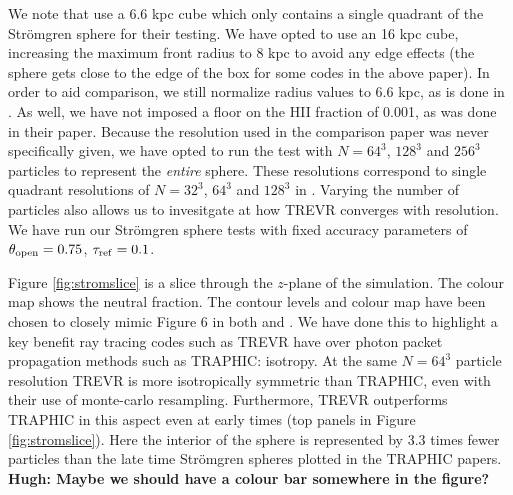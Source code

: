 \documentclass[fleq,usenatbib]{mnras}
\newcommand{\acro}{TREVR}
\newcommand{\comment}[1]{\textbf{\color{red}#1}}
\newcommand{\tO}{\theta_{\rm open}}
\newcommand{\strom}{Str\"omgren}
\begin{document}
{We note that \cite{ilievEt06} use a 6.6 kpc cube which only contains a single
quadrant of the \strom{} sphere for their testing. We have opted to use an 16 
kpc cube, increasing the maximum front radius to 8 kpc to avoid any edge 
effects (the sphere gets close to the edge of the box for some codes in 
the above paper). In order to aid comparison, we still normalize radius values 
to 6.6 kpc, as is done in \cite{ilievEt06}. As well, we have not imposed a 
floor on the HII fraction of 0.001, as was done in their paper. Because the 
resolution used in the \cite{ilievEt06} comparison paper was never 
specifically given, we have opted to run the test with $N = 64^3$, $128^3$ and 
$256^3$ particles to represent the \textit{entire} sphere. These resolutions 
correspond to single quadrant resolutions of $N=32^3$, $64^3$ and $128^3$ in 
\cite{ilievEt06}. Varying the number of particles also allows us to invesitgate
at how \acro{} converges with resolution. We have run our \strom{} sphere 
tests with fixed accuracy parameters of $\tO = 0.75$, 
$\tau_{\rm ref} = 0.1$.

Figure \ref{fig:stromslice} is a slice through the $z$-plane of the 
simulation. The colour map shows the neutral fraction. The contour 
levels and colour map have been chosen to closely mimic Figure 6 in both 
\cite{pawlikSchaye08} and \cite{pawlikSchaye11}. We have done this to 
highlight a key benefit ray tracing codes such as \acro{} have over photon 
packet propagation methods such as TRAPHIC: isotropy. At the same $N=64^3$ 
particle resolution \acro{} is more isotropically symmetric than TRAPHIC, even 
with their use of monte-carlo resampling. Furthermore, \acro{} outperforms 
TRAPHIC in this aspect even at early times (top panels in Figure 
\ref{fig:stromslice}). Here the interior of the sphere is represented by 3.3 
times fewer particles than the late time \strom{} spheres plotted in the 
TRAPHIC papers. \comment{Hugh: Maybe we should have a colour bar somewhere in 
the figure?}

}
\end{document}
